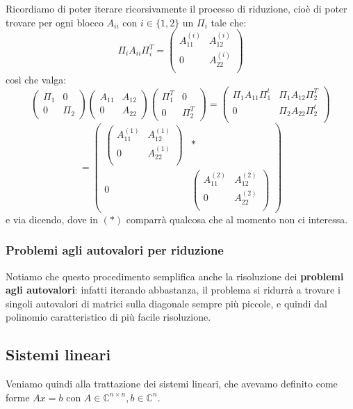 \documentclass[a4paper,11pt]{article}
\begin{document}
Ricordiamo di poter iterare ricorsivamente il processo di riduzione, cioè di poter trovare per ogni blocco $A_{ii}$ con $i \in \{ 1, 2 \}$ un $\Pi_i$ tale che:
$$
\Pi_i A_{ii} \Pi_i^T = \begin{pmatrix}
	A_{11}^{(i)} & A_{12}^{(i)} \\
	0 & A_{22}^{(i)} \\
\end{pmatrix}
$$
così che valga:
$$
\begin{pmatrix}
	\Pi_1 & 0 \\
	0 & \Pi_2
\end{pmatrix}
\begin{pmatrix}
	A_{11} & A_{12} \\
	0 & A_{22}
\end{pmatrix}
\begin{pmatrix}
	\Pi_1^T & 0 \\
	0 & \Pi_2^T
\end{pmatrix} =
\begin{pmatrix}
	\Pi_1 A_{11} \Pi_1^t & \Pi_1 A_{12} \Pi_2^T \\
	0 & \Pi_2 A_{22} \Pi_2^t \\
\end{pmatrix}
$$
$$
= \begin{pmatrix}
\begin{pmatrix}
	A_{11}^{(1)} & A_{12}^{(1)} \\
	0 & A_{22}^{(1)} \\
\end{pmatrix} & * \\
0 & 
\begin{pmatrix}
	A_{11}^{(2)} & A_{12}^{(2)} \\
	0 & A_{22}^{(2)} \\
\end{pmatrix}
\end{pmatrix}
$$
e via dicendo,
dove in $(*)$ comparrà qualcosa che al momento non ci interessa.

\subsubsection{Problemi agli autovalori per riduzione}
Notiamo che questo procedimento semplifica anche la risoluzione dei \textbf{problemi agli autovalori}: infatti iterando abbastanza, il problema si ridurrà a trovare i singoli autovalori di matrici sulla diagonale sempre più piccole, e quindi dal polinomio caratteristico di più facile risoluzione.

\subsection{Sistemi lineari}
Veniamo quindi alla trattazione dei sistemi lineari, che avevamo definito come forme $Ax = b$ con $A \in \mathbb{C}^{n \times n}, b \in \mathbb{C}^n$.
\end{document}
